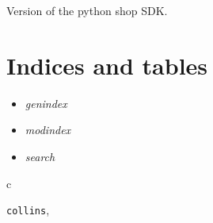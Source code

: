 \documentclass[letterpaper,10pt,english]{sphinxmanual}
\begin{document}
\begin{fulllineitems}

\begin{fulllineitems}
\label{collins:collins.Constants.SORT_UPDATED}
\end{fulllineitems}


\begin{fulllineitems}
\label{collins:collins.Constants.TYPES}
\end{fulllineitems}


\begin{fulllineitems}
\label{collins:collins.Constants.TYPE_CATEGORIES}
\end{fulllineitems}


\begin{fulllineitems}
\label{collins:collins.Constants.TYPE_PRODUCTS}
\end{fulllineitems}


\end{fulllineitems}


\begin{fulllineitems}
\label{collins:collins.VERSION}
Version of the python shop SDK.

\end{fulllineitems}



\chapter{Indices and tables}
\label{index:indices-and-tables}\begin{itemize}
\item {} 
\emph{genindex}

\item {} 
\emph{modindex}

\item {} 
\emph{search}

\end{itemize}


\renewcommand{\indexname}{Python Module Index}
\begin{theindex}
\def\bigletter#1{{\Large\sffamily#1}\nopagebreak\vspace{1mm}}
\bigletter{c}
\item {\texttt{collins}}, \pageref{collins:module-collins}
\end{theindex}

\renewcommand{\indexname}{Index}
\printindex
\end{document}
